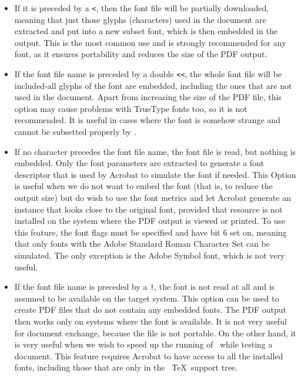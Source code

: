\begin{itemize}
  \begin{itemize}
    \item If it is preceded by a \verb|<|, then the font file will be
      partially downloaded, meaning that just those glyphs (characters)
      used in the document are extracted and put into a new subset font,
      which is then embedded in the output.  This is the most common use
      and is strongly recommended for any font, as it ensures portability
      and reduces the size of the PDF output. 
    \item If the font file name is preceded by a double \verb|<<|, the whole font file will 
      be included-all glyphs of the font are embedded, including the ones that 
      are not used in the document. Apart from increasing the size of the PDF 
      file, this option may cause problems with TrueType fonts too, so it is not 
      recommended. It is useful in cases where the font is somehow strange and 
      cannot be subsetted properly by \pdfTEX. 
    \item If no character precedes the font file name, the font file is
      read, but nothing is embedded. Only the font parameters are
      extracted to generate a font descriptor that is used by Acrobat to
      simulate the font if needed.  This Option is useful when we do not
      want to embed the font (that is, to reduce the output size) but do
      wish to use the font metrics
      and let Acrobat generate an instance that looks close to the
      original font, provided that resource is not installed on the system
      where the PDF output is viewed or printed.  To use this feature, the
      font flags must be specified and have bit 6 set on, meaning that
      only fonts with the Adobe Standard Roman Character Set can be
      simulated. The only exception is the Adobe Symbol font, which is not
      very useful. 
    \item If the font file name is preceded by a \verb|!|, the font is not read at all and is 
      assumed to be available on the target system. This option can be used to 
      create PDF files that do not contain any embedded fonts. The PDF output 
      then works only on systems where the font is available. It is not very useful 
      for document exchange, because the file is not portable. On the other hand, 
      it is very useful when we wish to speed up the running of \pdfTEX\  while 
      testing a document. This feature requires Acrobat to have access to all the 
      installed fonts, including those that are only in the \ \TeX\  support tree. 
  \end{itemize}
  

\end{itemize}
